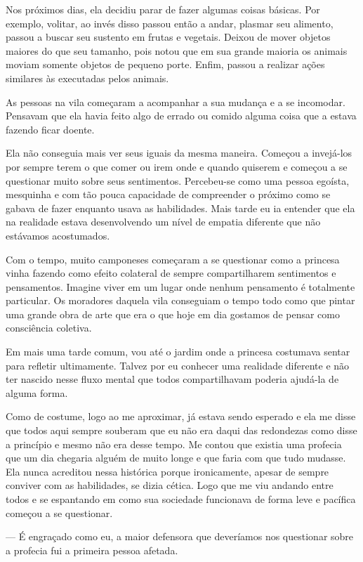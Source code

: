 Nos próximos dias, ela decidiu parar de fazer algumas coisas básicas. Por exemplo, volitar, ao invés disso passou então a andar, plasmar seu alimento, passou a buscar seu sustento em frutas e vegetais. Deixou de mover objetos maiores do que seu tamanho, pois notou que em sua grande maioria os animais moviam somente objetos de pequeno porte. Enfim, passou a realizar ações similares às executadas pelos animais.

As pessoas na vila começaram a acompanhar a sua mudança e a se incomodar. Pensavam que ela havia feito algo de errado ou comido alguma coisa que a estava fazendo ficar doente.

Ela não conseguia mais ver seus iguais da mesma maneira. Começou a invejá-los por sempre terem o que comer ou irem onde e quando quiserem e começou a se questionar muito sobre seus sentimentos. Percebeu-se como uma pessoa egoísta, mesquinha e com tão pouca capacidade de compreender o próximo como se gabava de fazer enquanto usava as habilidades. Mais tarde eu ia entender que ela na realidade estava desenvolvendo um nível de empatia diferente que não estávamos acostumados.

Com o tempo, muito camponeses começaram a se questionar como a princesa vinha fazendo como efeito colateral de sempre compartilharem sentimentos e pensamentos. Imagine viver em um lugar onde nenhum pensamento é totalmente particular. Os moradores daquela vila conseguiam o tempo todo como que pintar uma grande obra de arte que era o que hoje em dia gostamos de pensar como consciência coletiva.

Em mais uma tarde comum, vou até o jardim onde a princesa costumava sentar para refletir ultimamente. Talvez por eu conhecer uma realidade diferente e não ter nascido nesse fluxo mental que todos compartilhavam poderia ajudá-la de alguma forma.

Como de costume, logo ao me aproximar, já estava sendo esperado e ela me disse que todos aqui sempre souberam que eu não era daqui das redondezas como disse a princípio e mesmo não era desse tempo. Me contou que existia uma profecia que um dia chegaria alguém de muito longe e que faria com que tudo mudasse. Ela nunca acreditou nessa histórica porque ironicamente, apesar de sempre conviver com as habilidades, se dizia cética. Logo que me viu andando entre todos e se espantando em como sua sociedade funcionava de forma leve e pacífica começou a se questionar.

— É engraçado como eu, a maior defensora que deveríamos nos questionar sobre a profecia fui a primeira pessoa afetada.

